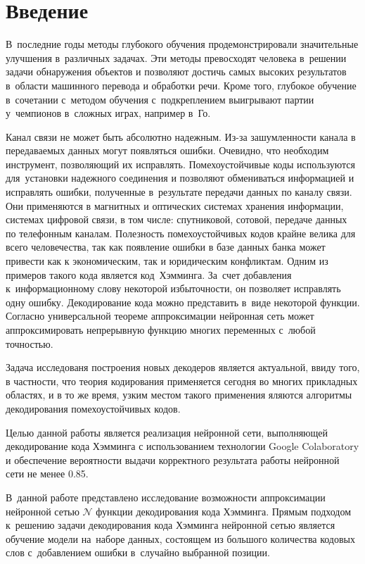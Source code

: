 \section{Введение}

В~последние годы методы глубокого обучения продемонстрировали значительные улучшения в~различных задачах\cite{bib:buhrstein}. Эти методы превосходят человека в~решении задачи обнаружения объектов и позволяют достичь самых высоких результатов в~области машинного перевода и обработки речи. Кроме того, глубокое обучение в~сочетании с~методом обучения с~подкреплением выигрывают партии у~чемпионов в~сложных играх, например в~Го\cite[c.\,484–489]{bib:win_go}.

Канал связи не может быть абсолютно надежным. Из-за зашумленности канала в передаваемых данных могут появляться ошибки. Очевидно, что необходим инструмент, позволяющий их исправлять. Помехоустойчивые коды\cite[с.\,4]{bib:codes} используются для~установки надежного соединения и позволяют обмениваться информацией и исправлять ошибки, полученные в~результате передачи данных по каналу связи. Они применяются в магнитных и оптических системах хранения информации, системах цифровой связи, в том числе: спутниковой, сотовой, передаче данных по телефонным каналам. Полезность помехоустойчивых кодов крайне велика для всего человечества, так как появление ошибки в базе данных банка может привести как к экономическим, так и юридическим конфликтам. Одним из примеров такого кода является код~Хэмминга\cite[с.\,49]{bib:codes2}. За~счет добавления к~информационному слову некоторой избыточности, он позволяет исправлять одну ошибку. Декодирование\cite[c.\,5]{bib:codes} кода можно представить в~виде некоторой функции. Согласно универсальной теореме аппроксимации\cite{bib:approximation_theorem} нейронная сеть\cite[с.\,23]{bib:neural_networks} может аппроксимировать непрерывную функцию многих переменных с~любой точностью.

Задача исследованя построения новых декодеров является актуальной, ввиду того, в частности, что теория кодирования применяется сегодня во многих прикладных областях, и в то же время, узким местом такого применения яляются алгоритмы декодирования помехоустойчивых кодов.

Целью данной работы является реализация нейронной сети, выполняющей декодирование кода Хэмминга с использованием технологии Google Colaboratory\cite{bib:google_colab} и обеспечение вероятности выдачи корректного результата работы нейронной сети не менее 0.85.

В~данной работе представлено исследование возможности аппроксимации нейронной сетью $\mathcal{N}$ функции декодирования кода Хэмминга. Прямым подходом к~решению задачи декодирования кода Хэмминга нейронной сетью является обучение модели на~наборе данных, состоящем из большого количества кодовых слов с~добавлением ошибки в~случайно выбранной позиции.


\newpage 